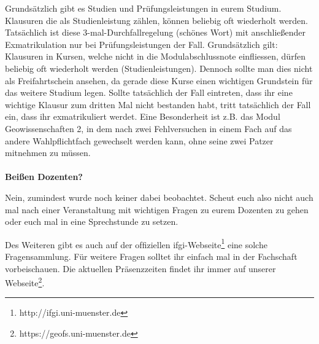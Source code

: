 Grundsätzlich gibt es Studien und Prüfungsleistungen in eurem Studium. Klausuren die als Studienleistung zählen, können beliebig oft wiederholt werden. Tatsächlich ist diese 3-mal-Durchfallregelung (schönes Wort) mit anschließender Exmatrikulation nur bei Prüfungsleistungen der Fall. Grundsätzlich gilt: Klausuren in Kursen, welche nicht in die Modulabschlussnote einfliessen, dürfen beliebig oft wiederholt werden (Studienleistungen). Dennoch sollte man dies nicht als Freifahrtschein ansehen, da gerade diese Kurse einen wichtigen Grundstein für das weitere Studium legen.
Sollte tatsächlich der Fall eintreten, dass ihr eine wichtige Klausur zum dritten Mal nicht bestanden habt, tritt tatsächlich der Fall ein, dass ihr exmatrikuliert werdet. Eine Besonderheit ist z.B. das Modul Geowissenschaften 2, in dem nach zwei Fehlversuchen in einem Fach auf das andere Wahlpflichtfach gewechselt werden kann, ohne seine zwei Patzer mitnehmen zu müssen.\\
\\

\textbf{Beißen Dozenten?}

Nein, zumindest wurde noch keiner dabei beobachtet. Scheut euch also nicht auch mal nach einer Veranstaltung mit wichtigen Fragen zu eurem Dozenten zu gehen oder euch mal in eine Sprechstunde zu setzen.

Des Weiteren gibt es auch auf der ofﬁziellen ifgi-Webseite\footnote{http://ifgi.uni-muenster.de} eine solche Fragensammlung. Für weitere Fragen solltet ihr einfach mal in der Fachschaft vorbeischauen. Die aktuellen Präsenzzeiten ﬁndet ihr immer auf unserer Webseite\footnote{https://geofs.uni-muenster.de}.

